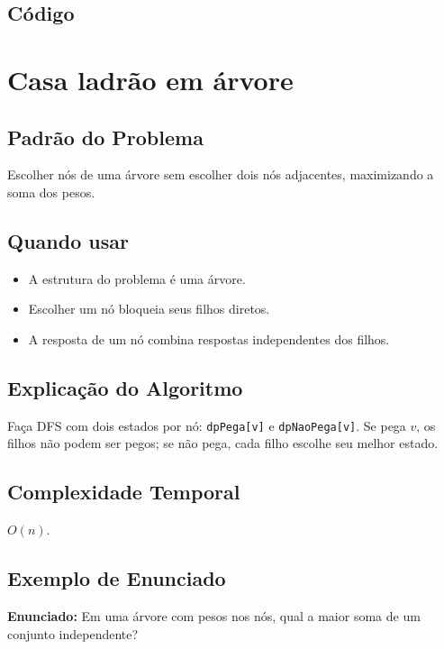 \subsection{Código}

\section{Casa ladrão em árvore}

\subsection{Padrão do Problema}
Escolher nós de uma árvore sem escolher dois nós adjacentes, maximizando a soma dos pesos.

\subsection{Quando usar}
\begin{itemize}[nosep]
  \item A estrutura do problema é uma árvore.
  \item Escolher um nó bloqueia seus filhos diretos.
  \item A resposta de um nó combina respostas independentes dos filhos.
\end{itemize}

\subsection{Explicação do Algoritmo}
Faça DFS com dois estados por nó: \texttt{dpPega[v]} e \texttt{dpNaoPega[v]}. Se pega $v$, os filhos não podem ser pegos; se não pega, cada filho escolhe seu melhor estado.

\subsection{Complexidade Temporal}
$O(n)$.

\subsection{Exemplo de Enunciado}
\begin{exemplodiabox}
\textbf{Enunciado:} Em uma árvore com pesos nos nós, qual a maior soma de um conjunto independente?
\end{exemplodiabox}

